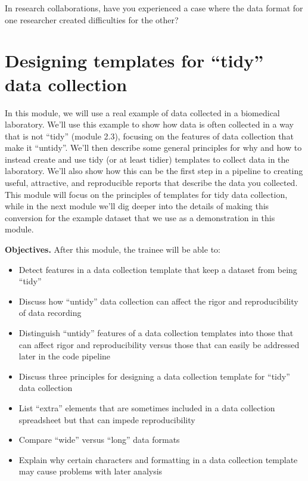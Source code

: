 \documentclass[]{tufte-book}
\providecommand{\tightlist}{%
  \setlength{\itemsep}{0pt}\setlength{\parskip}{0pt}}
\begin{document}
In research collaborations, have you experienced a case where the data format for one researcher created difficulties for the other?

\section{Designing templates for ``tidy'' data collection}\label{module4}

In this module, we will use a real example of data collected in a biomedical
laboratory. We'll use this example to show how data is often collected in a way
that is not ``tidy'' (module 2.3), focusing on the features of data collection
that make it ``untidy''. We'll then describe some general principles for why and
how to instead create and use tidy (or at least tidier) templates to collect
data in the laboratory. We'll also show how this can be the first step in a
pipeline to creating useful, attractive, and reproducible reports that describe
the data you collected. This module will focus on the principles of templates
for tidy data collection, while in the next module we'll dig deeper into the
details of making this conversion for the example dataset that we use as a
demonstration in this module.

\textbf{Objectives.} After this module, the trainee will be able to:

\begin{itemize}
\tightlist
\item
  Detect features in a data collection template that keep a dataset from being
  ``tidy''
\item
  Discuss how ``untidy'' data collection can affect the rigor and reproducibility
  of data recording
\item
  Distinguish ``untidy'' features of a data collection templates into those that
  can affect rigor and reproducibility versus those that can easily be addressed
  later in the code pipeline
\item
  Discuss three principles for designing a data collection template for ``tidy''
  data collection
\item
  List ``extra'' elements that are sometimes included in a data collection
  spreadsheet but that can impede reproducibility
\item
  Compare ``wide'' versus ``long'' data formats
\item
  Explain why certain characters and formatting in a data collection template
  may cause problems with later analysis
\end{itemize}
\end{document}
